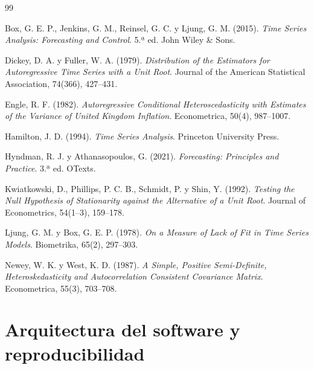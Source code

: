 \documentclass[11pt,letterpaper]{article}
\begin{document}
\begin{thebibliography}{99}

Box, G. E. P., Jenkins, G. M., Reinsel, G. C. y Ljung, G. M. (2015).
\emph{Time Series Analysis: Forecasting and Control}. 5.ª ed. John Wiley \& Sons.

Dickey, D. A. y Fuller, W. A. (1979).
\emph{Distribution of the Estimators for Autoregressive Time Series with a Unit Root}.
Journal of the American Statistical Association, 74(366), 427--431.

Engle, R. F. (1982).
\emph{Autoregressive Conditional Heteroscedasticity with Estimates of the Variance of United Kingdom Inflation}.
Econometrica, 50(4), 987--1007.

Hamilton, J. D. (1994).
\emph{Time Series Analysis}. Princeton University Press.

Hyndman, R. J. y Athanasopoulos, G. (2021).
\emph{Forecasting: Principles and Practice}. 3.ª ed. OTexts.

Kwiatkowski, D., Phillips, P. C. B., Schmidt, P. y Shin, Y. (1992).
\emph{Testing the Null Hypothesis of Stationarity against the Alternative of a Unit Root}.
Journal of Econometrics, 54(1--3), 159--178.

Ljung, G. M. y Box, G. E. P. (1978).
\emph{On a Measure of Lack of Fit in Time Series Models}.
Biometrika, 65(2), 297--303.

Newey, W. K. y West, K. D. (1987).
\emph{A Simple, Positive Semi-Definite, Heteroskedasticity and Autocorrelation Consistent Covariance Matrix}.
Econometrica, 55(3), 703--708.

\end{thebibliography}

\appendix

\section{Arquitectura del software y reproducibilidad}
\end{document}
